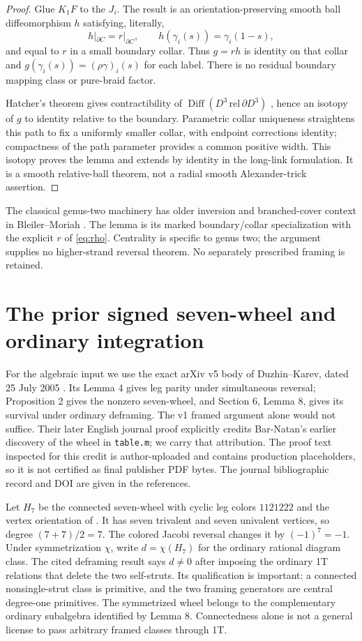 \documentclass[11pt]{article}
\theoremstyle{remark}\newtheorem{remark}[theorem]{Remark}
\newcommand{\Diff}{\operatorname{Diff}}
\begin{document}
\begin{proof}
Glue $K_1F$ to the $J_i$. The result is an orientation-preserving smooth
ball diffeomorphism $h$ satisfying, literally,
\[
h|_{\partial C}=r|_{\partial C},\qquad
h(\gamma_i(s))=\gamma_i(1-s),
\]
and equal to $r$ in a small boundary collar. Thus $g=rh$ is identity on
that collar and $g(\gamma_i(s))=(\rho\gamma)_i(s)$ for each label.
There is no residual boundary mapping class or pure-braid factor.

Hatcher's theorem gives contractibility of
$\Diff(D^3\,\mathrm{rel}\,\partial D^3)$
\cite[Appendix, p.~604, statement (1)]{HatcherSmale}, hence an isotopy
of $g$ to identity relative to the boundary. Parametric collar uniqueness
straightens this path to fix a uniformly smaller collar, with endpoint
corrections identity; compactness of the path parameter provides a common
positive width. This isotopy proves the lemma and extends by identity in
the long-link formulation. It is a smooth relative-ball theorem, not a
radial smooth Alexander-trick assertion.
\end{proof}
The classical genus-two machinery has older inversion and branched-cover
context in Bleiler--Moriah \cite[\S1.3]{BleilerMoriah}. The lemma is its
marked boundary/collar specialization with the explicit $r$ of
\eqref{eq:rho}. Centrality is specific to genus two; the argument supplies
no higher-strand reversal theorem. No separately prescribed framing is
retained.

\section{The prior signed seven-wheel and ordinary integration}
For the algebraic input we use the exact arXiv v5 body of Duzhin--Karev,
dated 25 July 2005 \cite{DKv5}. Its Lemma 4 gives leg parity under
simultaneous reversal; Proposition 2 gives the nonzero seven-wheel, and
Section 6, Lemma 8, gives its survival under ordinary deframing. The v1
framed argument alone would not suffice. Their later English journal proof
\cite[\S5, Remark 1]{DKjournal} explicitly credits Bar-Natan's earlier
discovery of the wheel in \texttt{table.m}; we carry that attribution.
The proof text inspected for this credit is author-uploaded and contains
production placeholders, so it is not certified as final publisher PDF
bytes. The journal bibliographic record and DOI are given in the references.

Let $H_7$ be the connected seven-wheel with cyclic leg colors $1121222$
and the vertex orientation of \cite[Proposition 2]{DKv5}. It has seven
trivalent and seven univalent vertices, so degree $(7+7)/2=7$. The colored
Jacobi reversal changes it by $(-1)^7=-1$. Under symmetrization $\chi$,
write $d=\chi(H_7)$ for the ordinary rational diagram class. The cited
deframing result says $d\ne0$ after imposing the ordinary 1T relations
that delete the two self-struts. Its qualification is important: a connected
nonsingle-strut class is primitive, and the two framing generators are
central degree-one primitives. The symmetrized wheel belongs to the
complementary ordinary subalgebra identified by Lemma 8. Connectedness
alone is not a general license to pass arbitrary framed classes through 1T.
\end{document}
